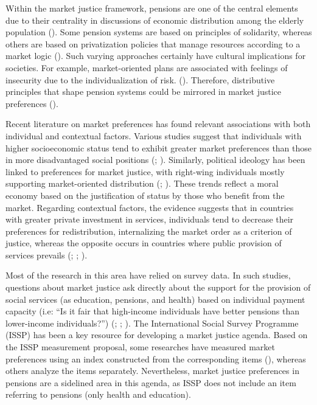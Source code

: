 \documentclass[
  12pt,
]{article}
\begin{document}
Within the market justice framework, pensions are one of the central
elements due to their centrality in discussions of economic distribution
among the elderly population
(). Some pension
systems are based on principles of solidarity, whereas others are based
on privatization policies that manage resources according to a market
logic (). Such varying approaches certainly have cultural
implications for societies. For example, market-oriented plans are
associated with feelings of insecurity due to the individualization of
risk. (). Therefore,
distributive principles that shape pension systems could be mirrored in
market justice preferences
().

Recent literature on market preferences has found relevant associations
with both individual and contextual factors. Various studies suggest
that individuals with higher socioeconomic status tend to exhibit
greater market preferences than those in more disadvantaged social
positions (;
). Similarly, political
ideology has been linked to preferences for market justice, with
right-wing individuals mostly supporting market-oriented distribution
(;
). These trends
reflect a moral economy based on the justification of status by those
who benefit from the market. Regarding contextual factors, the evidence
suggests that in countries with greater private investment in services,
individuals tend to decrease their preferences for redistribution,
internalizing the market order as a criterion of justice, whereas the
opposite occurs in countries where public provision of services prevails
(;
;
).

Most of the research in this area have relied on survey data. In such
studies, questions about market justice ask directly about the support
for the provision of social services (as education, pensions, and
health) based on individual payment capacity (i.e: ``Is it fair that
high-income individuals have better pensions than lower-income
individuals?'') (; ;
). The International Social
Survey Programme (ISSP) has been a key resource for developing a market
justice agenda. Based on the ISSP measurement proposal, some researches
have measured market preferences using an index constructed from the
corresponding items (), whereas others analyze the items separately.
Nevertheless, market justice preferences in pensions are a sidelined
area in this agenda, as ISSP does not include an item referring to
pensions (only health and education).
\end{document}
